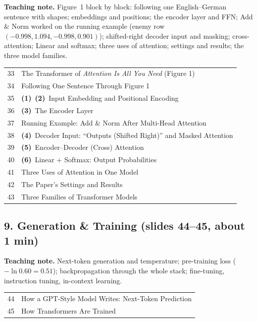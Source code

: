 \documentclass[11pt]{article}
\providecommand{\cn}[1]{\textbf{(#1)}}
\begin{document}
\textbf{Teaching note.} Figure~1 block by block: following one English--German sentence with shapes; embeddings and positions; the encoder layer and FFN; Add \& Norm worked on the running example (enemy row $(-0.998,1.094,-0.998,0.901)$); shifted-right decoder input and masking; cross-attention; Linear and softmax; three uses of attention; settings and results; the three model families.

\begin{center}\small\renewcommand{\arraystretch}{1.1}\begin{tabularx}{\textwidth}{@{}r X@{}}33 & The Transformer of \emph{Attention Is All You Need} (Figure 1)\\
34 & Following One Sentence Through Figure 1\\
35 & \cn{1}\ \cn{2}\ Input Embedding and Positional Encoding\\
36 & \cn{3}\ The Encoder Layer\\
37 & Running Example: Add \& Norm After Multi-Head Attention\\
38 & \cn{4}\ Decoder Input: ``Outputs (Shifted Right)'' and Masked Attention\\
39 & \cn{5}\ Encoder--Decoder (Cross) Attention\\
40 & \cn{6}\ Linear + Softmax: Output Probabilities\\
41 & Three Uses of Attention in One Model\\
42 & The Paper's Settings and Results\\
43 & Three Families of Transformer Models\\\end{tabularx}\end{center}

\subsection{9. Generation \& Training \normalfont\small\color{GreyN}(slides 44--45, about 1 min)}

\textbf{Teaching note.} Next-token generation and temperature; pre-training loss ($-\ln0.60=0.51$); backpropagation through the whole stack; fine-tuning, instruction tuning, in-context learning.

\begin{center}\small\renewcommand{\arraystretch}{1.1}\begin{tabularx}{\textwidth}{@{}r X@{}}44 & How a GPT-Style Model Writes: Next-Token Prediction\\
45 & How Transformers Are Trained\\\end{tabularx}\end{center}
\end{document}
